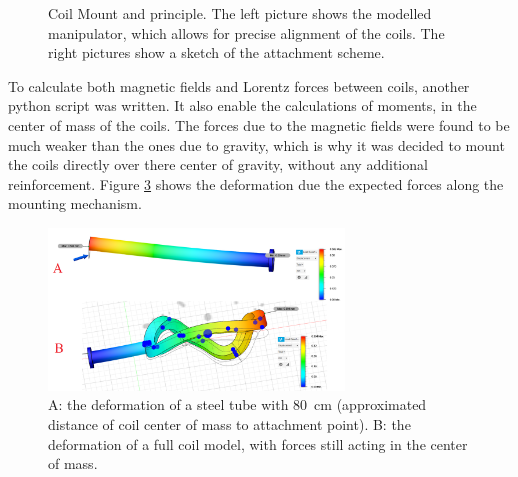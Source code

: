 \begin{figure}[H]
\begin{subfigure}[b]{0.5\textwidth}
        \label{fig:Coil mount drawing}
    \end{subfigure}
    \caption{Coil Mount and principle. The left picture shows the modelled manipulator, which allows for precise alignment of the coils. The right pictures show a sketch of the attachment scheme.}
    \label{fig:mount}
\end{figure}
To calculate both magnetic fields and Lorentz forces between coils, another python script was written.
It also enable the calculations of moments, in the center of mass of the coils.
The forces due to the magnetic fields were found to be much weaker than the ones due to gravity, which is why it was decided to mount the coils directly over there center of gravity, without any additional reinforcement.
Figure \ref{fig:mount_stress} shows the deformation due the expected forces along the mounting mechanism.
\begin{figure}[H]
    \centering
    \includegraphics[width=0.7\textwidth]{Images/02_Coils/mount_stress.png}
    \caption{A: the deformation of a steel tube with \SI{80}{cm} (approximated distance of coil center of mass to attachment point). B: the deformation of a full coil model, with forces still acting in the center of mass.}
    \label{fig:mount_stress}
\end{figure}





